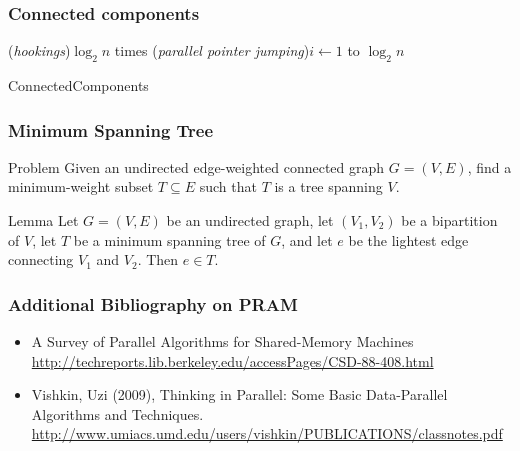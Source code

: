 \documentclass[12pt,aspectratio=169]{beamer}
\begin{document}
\begin{frame}\frametitle{Connected components}
  \begin{algorithm}[H]
    \For(\emph{hookings}){$\log_{2} n$ times}{
    \For(\emph{parallel pointer jumping}){$i\gets 1$ to $\log_{2} n$}{
    }
  }
  \caption{ConnectedComponents}
  \end{algorithm}
\end{frame}


\begin{frame}\frametitle{Minimum Spanning Tree}
\begin{block}{Problem}
Given an undirected edge-weighted connected graph $G=(V,E)$, find a
minimum-weight subset
$T\subseteq E$ such that $T$ is a tree spanning $V$.    
\end{block}

\begin{block}{Lemma}
Let $G=(V,E)$ be an undirected graph, let $(V_{1}, V_{2})$ be a
bipartition of $V$, let $T$ be a minimum spanning tree of $G$, and let
$e$ be the lightest edge connecting $V_{1}$ and $V_{2}$.    
Then $e\in T$.    
\end{block}
\end{frame}


\begin{frame}\frametitle{Additional Bibliography on PRAM}

    \begin{itemize}[<.->]
    \item
A Survey of Parallel Algorithms for Shared-Memory Machines
\url{http://techreports.lib.berkeley.edu/accessPages/CSD-88-408.html}
    \item
Vishkin, Uzi (2009), Thinking in Parallel: Some Basic Data-Parallel Algorithms and
Techniques.    
\url{http://www.umiacs.umd.edu/users/vishkin/PUBLICATIONS/classnotes.pdf}    
\end{itemize}
\end{frame}
\end{document}
